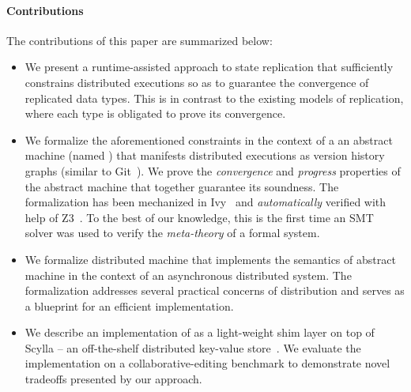 
\paragraph{Contributions} The contributions of this paper are summarized
below:
\begin{itemize}
  \item We present a runtime-assisted approach to state replication
    that sufficiently constrains distributed executions so as to
    guarantee the convergence of replicated data types. This is in
    contrast to the existing models of replication, where each type is
    obligated to prove its convergence.

  \item We formalize the aforementioned constraints in the context of
    a an abstract machine (named \quark) that manifests distributed
    executions as version history graphs (similar to Git~\cite{git}).
    We prove the \emph{convergence} and \emph{progress} properties of
    the \quark abstract machine that together guarantee its soundness.
    The formalization has been mechanized in Ivy~\cite{ivy} and
    \emph{automatically} verified with help of Z3~\cite{z3}. To the
    best of our knowledge, this is the first time an SMT solver was
    used to verify the \emph{meta-theory} of a formal system.

  \item We formalize \quark distributed machine that implements the
    semantics of \quark abstract machine in the context of an
    asynchronous distributed system. The formalization addresses
    several practical concerns of distribution and serves as a
    blueprint for an efficient implementation.

  \item We describe an implementation of \quark as a light-weight shim
    layer on top of Scylla -- an off-the-shelf distributed key-value
    store~\cite{scylla}. We evaluate the implementation on a
    collaborative-editing benchmark to demonstrate novel tradeoffs
    presented by our approach.
\end{itemize}

